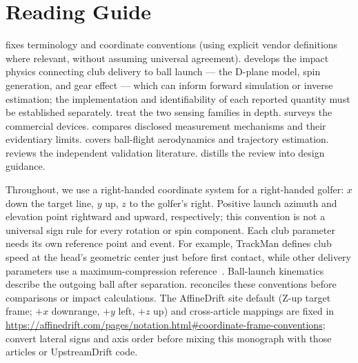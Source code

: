 \section{Reading Guide}

 fixes terminology and coordinate conventions
(using explicit vendor definitions where relevant, without assuming universal agreement).
 develops the impact physics connecting club delivery to
ball launch --- the D-plane model, spin generation, and gear effect --- which
can inform forward simulation or inverse estimation; the implementation and identifiability of each reported quantity must be established separately.  treat the two sensing families in
depth.  surveys the commercial devices.
 compares disclosed measurement mechanisms and their evidentiary limits.
 covers ball-flight aerodynamics and trajectory estimation.
 reviews the independent validation literature.
 distills the review into design guidance.

\begin{keypoint}
Throughout, we use a right-handed coordinate system for a right-handed
golfer: $x$ down the target line, $y$ up, $z$ to the golfer's right.
Positive launch azimuth and elevation point rightward and upward, respectively; this convention is not a universal sign rule for every rotation or spin component.
Each club parameter needs its own reference point and event.
For example, TrackMan defines club speed at the head's geometric center just before first contact, while other delivery parameters use a maximum-compression reference~\cite{trackmanclubspeed,trackmanparameterdefinitions}.
Ball-launch kinematics describe the outgoing ball after separation.
 reconciles these conventions before comparisons or impact calculations.
The AffineDrift site default (Z-up target frame; $+x$ downrange, $+y$ left, $+z$ up) and cross-article mappings are fixed in \url{https://affinedrift.com/pages/notation.html\#coordinate-frame-conventions}; convert lateral signs and axis order before mixing this monograph with those articles or UpstreamDrift code.
\end{keypoint}
